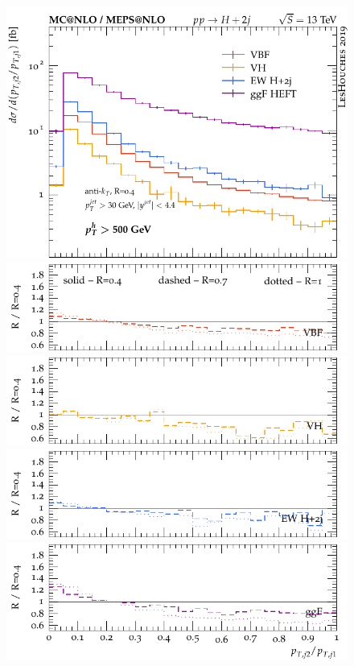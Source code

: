 \documentclass[10pt,prd,fleqn,superscriptaddress,notitlepage,nofootinbib,preprintnumbers,nobalancelastpage]{revtex4-1}
\begin{document}
\begin{figure}[p]
\begin{minipage}{.2925\textwidth}
  \end{minipage}\hfill
  \begin{minipage}{.2925\textwidth}
    \includegraphics[width=\textwidth]{figures/channels/pt2_pt1_pth500.pdf}
    \includegraphics[width=\textwidth]{figures/channels/pt2_pt1_pth500_rVBF.pdf}
    \includegraphics[width=\textwidth]{figures/channels/pt2_pt1_pth500_rVH.pdf}
    \includegraphics[width=\textwidth]{figures/channels/pt2_pt1_pth500_rHJJ.pdf}
    \includegraphics[width=\textwidth]{figures/channels/pt2_pt1_pth500_rGGH.pdf}

\end{minipage}
\end{figure}
\end{document}
